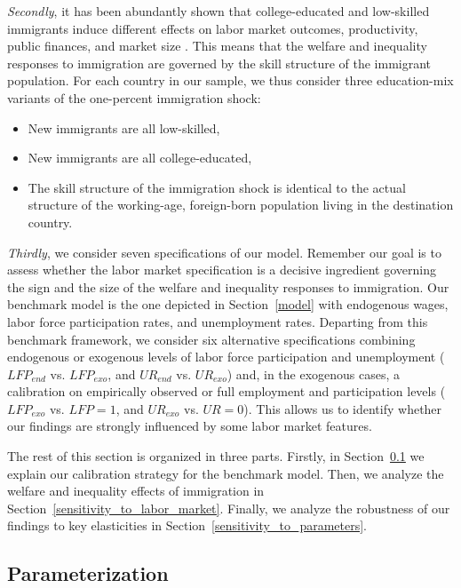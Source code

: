 \documentclass[a4paper,12pt]{article}
\begin{document}
\emph{Secondly}, it has been abundantly shown that college-educated and
low-skilled immigrants induce different effects on labor market outcomes,
productivity, public finances, and market size 
\citep[see][]{Borjas2003,
Manacorda2012, Ottaviano2012}. This means that the welfare and inequality
responses to immigration are governed by the skill structure of the
immigrant population. For each country in our sample, we thus consider three
education-mix variants of the one-percent immigration shock:
\begin{itemize}
    \item New immigrants are all low-skilled,
    \item New immigrants are all college-educated,
    \item The skill structure of the immigration shock is identical to the actual structure of the working-age, foreign-born population living in the destination country.
\end{itemize}

\emph{Thirdly}, we consider seven specifications of our model. Remember our
goal is to assess whether the labor market specification is a decisive
ingredient governing the sign and the size of the welfare and inequality
responses to immigration. Our benchmark model is the one depicted %
in Section~\ref{model} with endogenous wages, labor force participation rates, and unemployment
rates. Departing from this benchmark framework, we consider six alternative
specifications combining endogenous or exogenous levels of labor force
participation and unemployment ($LFP_{end}$ vs. $LFP_{exo}$, and $UR_{end}$
vs. $UR_{exo}$) and, in the exogenous cases, a calibration on empirically
observed or full employment and participation levels ($LFP_{exo}$ vs. $LFP=1$, and $UR_{exo}$
vs. $UR=0$). This allows us to identify whether our findings are strongly
influenced by some labor market features.

The rest of this section is organized in three parts. Firstly, in Section~\ref{parameterization} we explain our calibration strategy for the benchmark
model. Then, we analyze the welfare and inequality effects of immigration in Section~\ref{sensitivity_to_labor_market}. Finally, we analyze the robustness of our findings to key elasticities in Section~\ref{sensitivity_to_parameters}.

\subsection{Parameterization} \label{parameterization}
\end{document}

